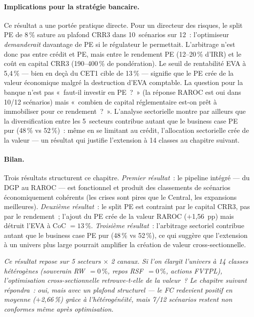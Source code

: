 \documentclass[10pt, a4paper, oneside]{report}
\theoremstyle{definition}
\begin{document}
\paragraph{Implications pour la stratégie bancaire.} Ce résultat a une portée pratique directe. Pour un directeur des risques, le split PE de 8\,\% sature au plafond CRR3 dans 10~scénarios sur 12~: l'optimiseur \emph{demanderait} davantage de PE si le régulateur le permettait. L'arbitrage n'est donc pas entre crédit et PE, mais entre le rendement PE (12--20\,\% d'IRR) et le coût en capital CRR3 (190--400\,\% de pondération). Le seuil de rentabilité EVA à 5{,}4\,\% --- bien en deçà du CET1 cible de 13\,\% --- signifie que le PE crée de la valeur économique malgré la destruction d'EVA comptable. La question pour la banque n'est pas «~faut-il investir en PE~?~» (la réponse RAROC est oui dans 10/12 scénarios) mais «~combien de capital réglementaire est-on prêt à immobiliser pour ce rendement~?~». L'analyse sectorielle montre par ailleurs que la diversification entre les 5~secteurs contribue autant que le business case PE pur (48\,\% vs 52\,\%)~: même en se limitant au crédit, l'allocation sectorielle crée de la valeur --- un résultat qui justifie l'extension à 14 classes au chapitre suivant.


\paragraph{Bilan.} Trois résultats structurent ce chapitre. \emph{Premier résultat}~: le pipeline intégré --- du DGP au RAROC --- est fonctionnel et produit des classements de scénarios économiquement cohérents (les crises sont pires que le Central, les expansions meilleures). \emph{Deuxième résultat}~: le split PE est contraint par le capital CRR3, pas par le rendement~; l'ajout du PE crée de la valeur RAROC ($+$1{,}56~pp) mais détruit l'EVA à CoC $= 13\,\%$. \emph{Troisième résultat}~: l'arbitrage sectoriel contribue autant que le business case PE pur (48\,\% vs 52\,\%), ce qui suggère que l'extension à un univers plus large pourrait amplifier la création de valeur cross-sectionnelle.

\bigskip\noindent\textit{Ce résultat repose sur 5 secteurs $\times$ 2 canaux. Si l'on élargit l'univers à 14 classes hétérogènes (souverain RW~$= 0\,\%$, repos RSF~$= 0\,\%$, actions FVTPL), l'optimisation cross-sectionnelle retrouve-t-elle de la valeur~? Le chapitre suivant répondra~: oui, mais avec un plafond structurel --- le FC redevient positif en moyenne ($+$2{,}66\,\%) grâce à l'hétérogénéité, mais 7/12 scénarios restent non conformes même après optimisation.}
\end{document}
